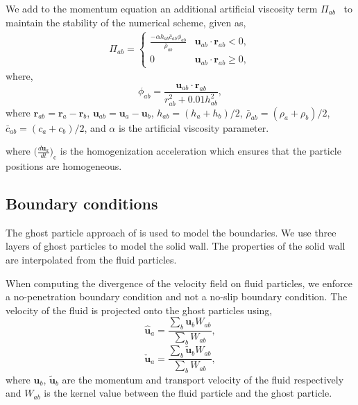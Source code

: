 \documentclass[preprint,12pt]{elsarticle}
\newcommand{\ten}[1]{\ensuremath{\mathbf{#1}}}
\begin{document}
We add to the momentum equation an additional artificial viscosity term
$\Pi_{ab}$~\cite{monaghan-review:2005} to maintain the stability of the
numerical scheme, given as,
\begin{align}
  \label{eq:mom-av}
  \Pi_{ab} =
  \begin{cases}
\frac{-\alpha h_{ab} \bar{c}_{ab} \phi_{ab}}{\bar{\rho}_{ab}}
  & \ten{u}_{ab}\cdot \ten{r}_{ab} < 0, \\
  0 & \ten{u}_{ab}\cdot \ten{r}_{ab} \ge 0,
\end{cases}
\end{align}
where,
%
\begin{equation}
  \label{eq:av-phiij}
  \phi_{ab} = \frac{\ten{u}_{ab} \cdot \ten{r}_{ab}}{r^2_{ab} + 0.01 h^2_{ab}},
\end{equation}
%
where $\ten{r}_{ab} = \ten{r}_a - \ten{r}_b$, $\ten{u}_{ab} = \ten{u}_a -
\ten{u}_b$, $h_{ab} = (h_a + h_b)/2$, $\bar{\rho}_{ab} = (\rho_a + \rho_b)/2$,
$\bar{c}_{ab} = (c_a + c_b) / 2$, and $\alpha$ is the artificial
viscosity parameter.

%
where $\big(\frac{d \ten{u}_a}{dt}\big)_{\text{c}}$ is the homogenization
acceleration which ensures that the particle positions are homogeneous.


\subsection{Boundary conditions}

The ghost particle approach of \citet{Adami2012} is used to model the
boundaries. We use three layers of ghost particles to model the solid wall.
The properties of the solid wall are interpolated from the fluid particles.

When computing the divergence of the velocity field on fluid particles, we
enforce a no-penetration boundary condition and not a no-slip boundary
condition. The velocity of the fluid is projected onto the ghost particles
using,
\begin{equation}
  \label{eq:v-ghost}
  \ten{\hat{u}}_a = \frac{\sum_b\ten{u}_b W_{ab}}{\sum_b W_{ab}},
\end{equation}
\begin{equation}
  \label{eq:v-hat-ghost}
  \ten{\check{u}}_a = \frac{\sum_b\tilde{\ten{u}}_b W_{ab}}{\sum_b W_{ab}},
\end{equation}
where $\ten{u}_b$, $\ten{\tilde{u}}_b$ are the momentum and transport velocity
of the fluid respectively and $W_{ab}$ is the kernel value between the fluid
particle and the ghost particle.
\end{document}
